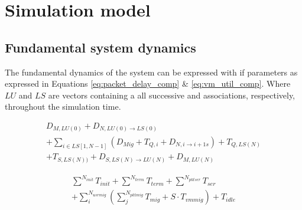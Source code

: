 \section{Simulation model}
\label{sec:simulation_model}







\subsection{Fundamental system dynamics}

The fundamental dynamics of the system can be expressed with if parameters as expressed in Equations \ref{eq:packet_delay_comp} \& \ref{eq:vm_util_comp}. Where $LU$ and $LS$ are vectors containing a \ues all successive \rbs and \dc associations, respectively, throughout the simulation time.

\begin{multline}
D_{M,LU(0)}+D_{N,LU(0) \rightarrow LS(0)} \\ + \sum_{i \in LS[1,N-1]} \left( D_{Mig} + T_{Q,i} + D_{N,i \rightarrow i+1s} \right) + T_{Q,LS(N)} \\ + T_{S,LS(N))} + D_{S,{LS(N)} \rightarrow LU(N)} + D_{M,LU(N)}
\label{eq:packet_delay_comp}
\end{multline}

\begin{multline}
\sum^{N_{init}} T_{init} + \sum^{N_{term}} T_{term} + \sum^{N_{pktser}} T_{ser}  \\ + \sum_{i}^{N_{usrmig}}  \left( \sum_{j}^{N_{pktmig}}  T_{mig} +S\cdot T_{vmmig} \right ) + T_{idle}
\label{eq:vm_util_comp}
\end{multline}